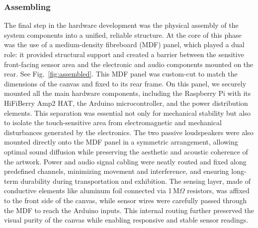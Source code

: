 \documentclass{article}
\begin{document}
\subsubsection{Assembling}
The final step in the hardware development was the physical assembly of the system components into a unified, reliable structure. At the core of this phase was the use of a medium-density fibreboard (MDF) panel, which played a dual role: it provided structural support and created a barrier between the sensitive front-facing sensor area and the electronic and audio components mounted on the rear. See Fig.~\ref{fig:assembled}. \newline 
This MDF panel was custom-cut to match the dimensions of the canvas and fixed to its rear frame. On this panel, we securely mounted all the main hardware components, including the Raspberry Pi with its HiFiBerry Amp2 HAT, the Arduino microcontroller, and the power distribution elements. This separation was essential not only for mechanical stability but also to isolate the touch-sensitive area from electromagnetic and mechanical disturbances generated by the electronics. \newline 
The two passive loudspeakers were also mounted directly onto the MDF panel in a symmetric arrangement, allowing optimal sound diffusion while preserving the aesthetic and acoustic coherence of the artwork. Power and audio signal cabling were neatly routed and fixed along predefined channels, minimizing movement and interference, and ensuring long-term durability during transportation and exhibition. \newline 
The sensing layer, made of conductive elements like aluminum foil connected via 1\,M$\Omega$ resistors, was affixed to the front side of the canvas, while sensor wires were carefully passed through the MDF to reach the Arduino inputs. This internal routing further preserved the visual purity of the canvas while enabling responsive and stable sensor readings.
\end{document}
